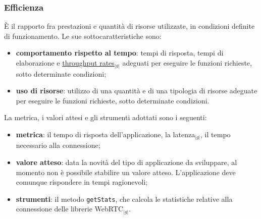 {	\subsubsection{Efficienza}{
	    \`E il rapporto fra prestazioni e quantità di risorse utilizzate, in condizioni definite di funzionamento. Le sue sottocaratteristiche sono:
	    \begin{itemize}
		\item \textbf{comportamento rispetto al tempo}: tempi di risposta, tempi di elaborazione e \underline{throughput rates}$_{|g|}$ adeguati per eseguire le 
		      funzioni richieste, sotto determinate condizioni;
		\item \textbf{uso di risorse}: utilizzo di una quantità e di una tipologia di risorse adeguate per eseguire le funzioni richieste, sotto determinate condizioni.\\
	     \end{itemize}
	     La metrica, i valori attesi e gli strumenti adottati sono i seguenti:
	     \begin{itemize}
		\item \textbf{metrica}: il tempo di risposta dell’applicazione, la latenza$_{|g|}$, il tempo necessario alla connessione;
		\item \textbf{valore atteso}: data la novità del tipo di applicazione da sviluppare, al momento non è possibile stabilire un valore atteso.
		      L'applicazione deve comunque rispondere in tempi ragionevoli;
		\item \textbf{strumenti}: il metodo \texttt{getStats}, che calcola le statistiche relative alla connessione delle librerie WebRTC$_{|g|}$.
	      \end{itemize}
	}
}
